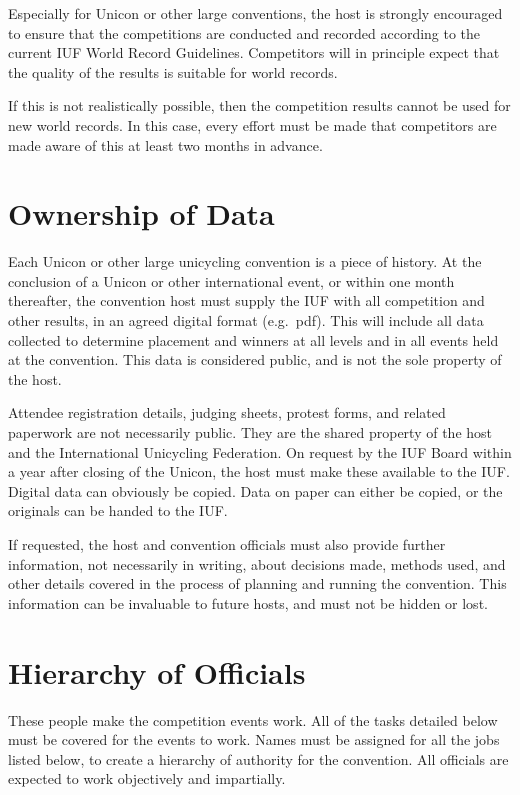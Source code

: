 Especially for Unicon or other large conventions, the host is strongly encouraged to ensure that the competitions are conducted and recorded according to the current IUF World Record Guidelines.
Competitors will in principle expect that the quality of the results is suitable for world records.

If this is not realistically possible, then the competition results cannot be used for new world records.
In this case, every effort must be made that competitors are made aware of this at least two months in advance.

\section{Ownership of Data}

Each Unicon or other large unicycling convention is a piece of history.
At the conclusion of a Unicon or other international event, or within one month thereafter, the convention host must supply the IUF with all competition and other results, in an agreed digital format (e.g.\ pdf).
This will include all data collected to determine placement and winners at all levels and in all events held at the convention.
This data is considered public, and is not the sole property of the host.

Attendee registration details, judging sheets, protest forms, and related paperwork are not necessarily public.
They are the shared property of the host and the International Unicycling Federation.
On request by the IUF Board within a year after closing of the Unicon, the host must make these available to the IUF.
Digital data can obviously be copied. Data on paper can either be copied, or the originals can be handed to the IUF.

If requested, the host and convention officials must also provide further information, not necessarily in writing, about decisions made, methods used, and other details covered in the process of planning and running the convention.
This information can be invaluable to future hosts, and must not be hidden or lost.

\section{Hierarchy of Officials}

These people make the competition events work.
All of the tasks detailed below must be covered for the events to work.
Names must be assigned for all the jobs listed below, to create a hierarchy of authority for the convention.
All officials are expected to work objectively and impartially.

